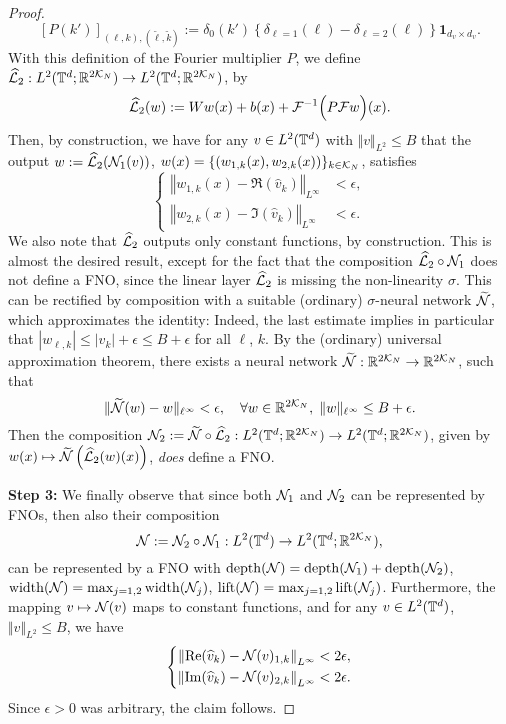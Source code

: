 \documentclass[reqno,a4paper]{amsart}
\begin{document}
\begin{proof}
\[
[P(k')]_{(\ell,k),(\tilde{\ell},\tilde{k})} := \delta_{0}(k') \left\{\delta_{\ell=1}(\ell) - \delta_{\ell=2}(\ell)\right\} \bm{1}_{d_v\times d_v}.
\]
With this definition of the Fourier multiplier $P$, we define $\widehat{\mathcal{L}}_2: L^2(\mathbb{T}^d; \mathbb{R}^{2\mathcal{K}_N}) \to L^2(\mathbb{T}^d; \mathbb{R}^{2\mathcal{K}_N})$, by
\[
\widehat{\mathcal{L}}_2(w) := Ww(x) + b(x) + \mathcal{F}^{-1} \Big(P\mathcal{F} w\Big)(x).
\]
Then, by construction, we have for any $v\in L^2(\mathbb{T}^d)$ with $\Vert v \Vert_{L^2} \le B$ that the output $w := \widehat{\mathcal{L}}_2(\mathcal{N}_1(v))$, $w(x) = \{(w_{1,k}(x),w_{2,k}(x)) \}_{k\in \mathcal{K}_N}$, satisfies 
\[
\left\{
\begin{aligned}
\left\Vert
w_{1,k}(x) - \Re(\hat{v}_k)
\right\Vert_{L^\infty}
&< \epsilon, \\
\left\Vert
w_{2,k}(x) - \Im(\hat{v}_k)
\right\Vert_{L^\infty}
&< \epsilon.
\end{aligned}
\right.
\]
We also note that $\widehat{\mathcal{L}}_2$ outputs only constant functions, by construction.
This is almost the desired result, except for the fact that the composition $\widehat{\mathcal{L}}_2 \circ \mathcal{N}_1$ does not define a FNO, since the linear layer $\widehat{\mathcal{L}}_2$ is missing the non-linearity $\sigma$. This can be rectified by composition with a suitable (ordinary) $\sigma$-neural network $\widetilde{\mathcal{N}}$, which approximates the identity: Indeed, the last estimate implies in particular that $|w_{\ell,k}| \le |\hat{v}_k| + \epsilon \le B + \epsilon$ for all $\ell$, $k$. By the (ordinary) universal approximation theorem, there exists a neural network $\widetilde{\mathcal{N}}: \mathbb{R}^{2\mathcal{K}_N} \to \mathbb{R}^{2\mathcal{K}_N}$, such that \[
\Vert \widetilde{\mathcal{N}}(w) - w \Vert_{\ell^\infty} < \epsilon,
\quad 
\forall w\in \mathbb{R}^{2\mathcal{K}_N}, \; \Vert w \Vert_{\ell^\infty} \le B + \epsilon.
\]
Then the composition $\mathcal{N}_2 := \widetilde{\mathcal{N}} \circ \widehat{\mathcal{L}}_2: L^2(\mathbb{T}^d;\mathbb{R}^{2\mathcal{K}_N}) \to L^2(\mathbb{T}^d;\mathbb{R}^{2\mathcal{K}_N})$, given by $w(x) \mapsto \widetilde{\mathcal{N}}\left(\widehat{\mathcal{L}}_2(w)(x)\right)$, \emph{does} define a FNO.

\textbf{Step 3:} We finally observe that since both $\mathcal{N}_1$ and $\mathcal{N}_2$ can be represented by FNOs, then also their composition 
\[
\mathcal{N} := \mathcal{N}_2 \circ \mathcal{N}_1: L^2(\mathbb{T}^d) \to L^2(\mathbb{T}^d;\mathbb{R}^{2\mathcal{K}_N}),
\]
can be represented by a FNO with $\mathrm{depth}(\mathcal{N}) = \mathrm{depth}(\mathcal{N}_1) + \mathrm{depth}(\mathcal{N}_2)$, $\mathrm{width}(\mathcal{N}) = \max_{j=1,2} \mathrm{width}(\mathcal{N}_j)$, $\mathrm{lift}(\mathcal{N}) = \max_{j=1,2} \mathrm{lift}(\mathcal{N}_j)$. Furthermore, the mapping $v\mapsto \mathcal{N}(v)$ maps to constant functions, and for any $v\in L^2(\mathbb{T}^d)$, $\Vert v \Vert_{L^2} \le B$, we have
\[
\left\{
\begin{aligned}
\left\Vert
\mathrm{Re}(\widehat{v}_k) - \mathcal{N}(v)_{1,k}
\right\Vert_{L^\infty} 
< 2\epsilon, \\
\left\Vert
\mathrm{Im}(\widehat{v}_k) - \mathcal{N}(v)_{2,k}
\right\Vert_{L^\infty}
< 2\epsilon.
\end{aligned}
\right.
\]
Since $\epsilon > 0$ was arbitrary, the claim follows.
\end{proof}
\end{document}
